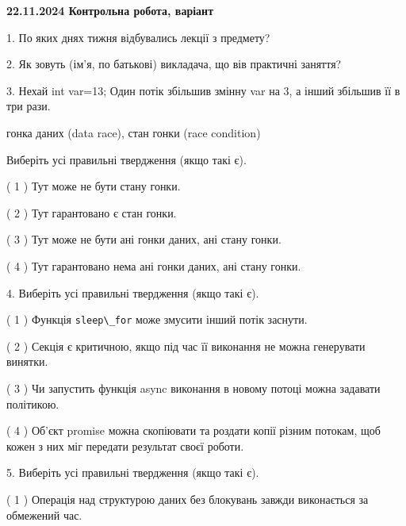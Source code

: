 \documentclass[12pt, ukrainian]{article}
\def\code#1{\Verb!#1!}
\begin{document}
\vspace{4mm}
\newpage
\begin {large}

\textbf{22.11.2024 Контрольна робота, варіант  }\par


{
1. По яких днях тижня відбувались лекції з предмету?



\vspace{5mm}
2. Як зовуть (ім'я, по батькові) викладача, що вів практичні заняття?



\vspace{5mm}
3. Нехай int var=13; Один потік збільшив змінну var на 3, а інший збільшив її в три рази.

гонка даних (data race), стан гонки (race condition)

Виберіть усі правильні твердження (якщо такі є).\par
\vspace{2mm}
( 1 ) Тут може не бути стану гонки.%

( 2 ) Тут гарантовано є стан гонки.%

( 3 ) Тут може не бути ані гонки даних, ані стану гонки.%

( 4 ) Тут гарантовано нема ані гонки даних, ані стану гонки.%


\vspace{5mm}
4. Виберіть усі правильні твердження (якщо такі є).\par
\vspace{2mm}

( 1 ) Функція \code{sleep\_for} може змусити інший потік заснути.%

( 2 ) Секція є критичною, якщо під час її виконання не можна генерувати винятки.%

( 3 ) Чи запустить функція  async виконання в новому потоці можна задавати політикою.%

( 4 ) Об’єкт promise можна скопіювати та роздати копії різним потокам, щоб кожен з них міг передати результат своєї роботи.%


\vspace{5mm}
5. Виберіть усі правильні твердження (якщо такі є).\par
\vspace{2mm}

( 1 ) Операція над структурою даних без блокувань завжди виконається за обмежений час.%

}
\end{large}
\end{document}
